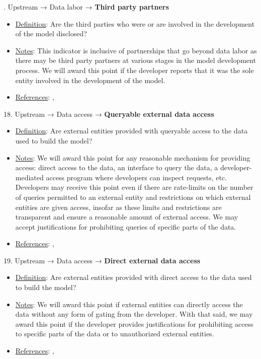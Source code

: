 . Upstream → Data labor → \textbf{Third party partners}
\vspace{-\parskip}
\begin{itemize}
\item
\underline{Definition}: Are the third parties who were or are involved in the development of the model disclosed?
\item
\underline{Notes}: This indicator is inclusive of partnerships that go beyond data labor as there may be third party partners at various stages in the model development process. We will award this point if the developer reports that it was the sole entity involved in the development of the model.
\item
\underline{References}: \citet{crawford2021atlas}, \citet{gray2019ghost}
\end{itemize}


18. Upstream → Data access → \textbf{Queryable external data access}
\vspace{-\parskip}
\begin{itemize}
\item
\underline{Definition}: Are external entities provided with queryable access to the data used to build the model?
\item
\underline{Notes}: We will award this point for any reasonable mechanism for providing access: direct access to the data, an interface to query the data, a developer-mediated access program where developers can inspect requests, etc. Developers may receive this point even if there are rate-limits on the number of queries permitted to an external entity and restrictions on which external entities are given access, insofar as these limits and restrictions are transparent and ensure a reasonable amount of external access. We may accept justifications for prohibiting queries of specific parts of the data.
\item
\underline{References}: \citet{gebru2021datasheets}, \citet{piktus2023roots}
\end{itemize}


19. Upstream → Data access → \textbf{Direct external data access}
\vspace{-\parskip}
\begin{itemize}
\item
\underline{Definition}: Are external entities provided with direct access to the data used to build the model?
\item
\underline{Notes}: We will award this point if external entities can directly access the data without any form of gating from the developer. With that said, we may award this point if the developer provides justifications for prohibiting access to specific parts of the data or to unauthorized external entities.
\item
\underline{References}: \citet{gebru2021datasheets}, \citet{piktus2023roots}
\end{itemize}


